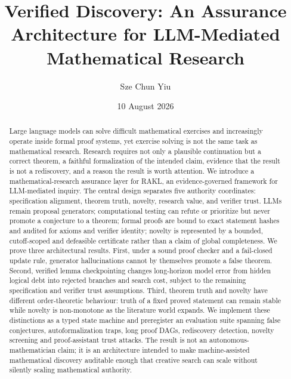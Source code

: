 \documentclass[11pt]{article}
\title{Verified Discovery: An Assurance Architecture for LLM-Mediated Mathematical Research}
\author{Sze Chun Yiu}
\date{10 August 2026}
\newcommand{\RAKL}{\textsc{RAKL}}
\begin{document}
\maketitle

\begin{abstract}
Large language models can solve difficult mathematical exercises and increasingly operate inside formal proof systems, yet exercise solving is not the same task as mathematical research. Research requires not only a plausible continuation but a correct theorem, a faithful formalization of the intended claim, evidence that the result is not a rediscovery, and a reason the result is worth attention. We introduce a mathematical-research assurance layer for \RAKL{}, an evidence-governed framework for LLM-mediated inquiry. The central design separates five authority coordinates: specification alignment, theorem truth, novelty, research value, and verifier trust. LLMs remain proposal generators; computational testing can refute or prioritize but never promote a conjecture to a theorem; formal proofs are bound to exact statement hashes and audited for axioms and verifier identity; novelty is represented by a bounded, cutoff-scoped and defeasible certificate rather than a claim of global completeness. We prove three architectural results. First, under a sound proof checker and a fail-closed update rule, generator hallucinations cannot by themselves promote a false theorem. Second, verified lemma checkpointing changes long-horizon model error from hidden logical debt into rejected branches and search cost, subject to the remaining specification and verifier trust assumptions. Third, theorem truth and novelty have different order-theoretic behaviour: truth of a fixed proved statement can remain stable while novelty is non-monotone as the literature world expands. We implement these distinctions as a typed state machine and preregister an evaluation suite spanning false conjectures, autoformalization traps, long proof DAGs, rediscovery detection, novelty screening and proof-assistant trust attacks. The result is not an autonomous-mathematician claim; it is an architecture intended to make machine-assisted mathematical discovery auditable enough that creative search can scale without silently scaling mathematical authority.
\end{abstract}


















\end{document}
